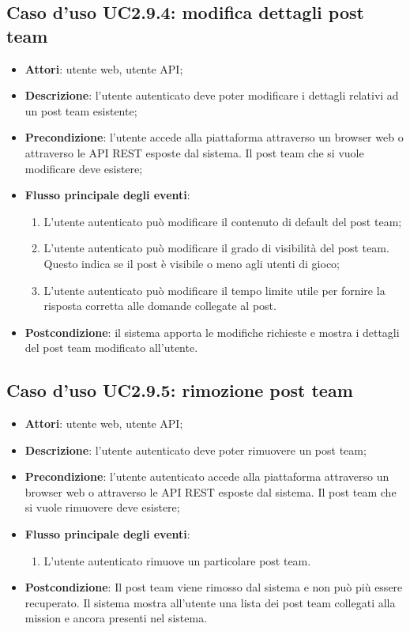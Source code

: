 \subsection{Caso d'uso UC2.9.4: modifica dettagli post team}
\begin{itemize}
\item \textbf{Attori}: utente web, utente API;
\item \textbf{Descrizione}: l'utente autenticato deve poter modificare i dettagli relativi ad un post team esistente; 
      \item \textbf{Precondizione}: l'utente accede alla piattaforma attraverso un browser web o attraverso le API REST esposte dal sistema. Il post team che si vuole modificare deve esistere;

        \item \textbf{Flusso principale degli eventi}:
          \begin{enumerate}
          \item L'utente autenticato può modificare il contenuto di default del post team;
          \item L'utente autenticato può modificare il grado di visibilità del post team. Questo indica se il post è visibile o meno agli utenti di gioco;
          \item L'utente autenticato può modificare il tempo limite utile per fornire la risposta corretta alle domande collegate al post.

      \end{enumerate}
    \item \textbf{Postcondizione}: il sistema apporta le modifiche richieste e mostra i dettagli del post team modificato all'utente.
  \end{itemize}
\hypertarget{UC2.9.5}{}
\subsection{Caso d'uso UC2.9.5: rimozione post team}
\begin{itemize}
\item \textbf{Attori}: utente web, utente API;
\item \textbf{Descrizione}: l'utente autenticato deve poter rimuovere un post team; 
      \item \textbf{Precondizione}: l'utente autenticato accede alla piattaforma attraverso un browser web o attraverso le API REST esposte dal sistema. Il post team che si vuole rimuovere deve esistere;

        \item \textbf{Flusso principale degli eventi}:
          \begin{enumerate}
          \item L'utente autenticato rimuove un particolare post team.

      \end{enumerate}
    \item \textbf{Postcondizione}: Il post team viene rimosso dal sistema e non può più essere recuperato. Il sistema mostra all'utente una lista dei post team collegati alla mission e ancora presenti nel sistema.
  \end{itemize}
\hypertarget{UC2.9.6}{}

